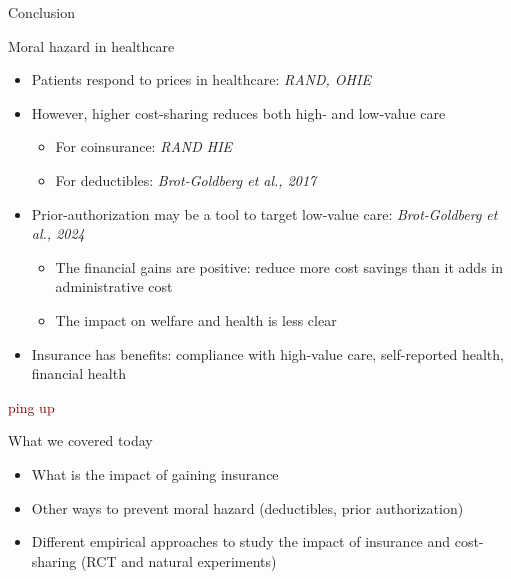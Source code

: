 \begin{frame}{Conclusion}

    Moral hazard in healthcare
    \begin{itemize}
        \item Patients respond to prices in healthcare: \textit{RAND, OHIE}
        \item However, higher cost-sharing reduces both high- and low-value care 
        \begin{itemize}
            \item For coinsurance: \textit{RAND HIE}
            \item For deductibles: \textit{Brot-Goldberg et al., 2017}
        \end{itemize}
        \item Prior-authorization may be a tool to target low-value care: \textit{Brot-Goldberg et al., 2024}
        \begin{itemize}
            \item The financial gains are positive: reduce more cost savings than it adds in administrative cost
            \item The impact on welfare and health is less clear
        \end{itemize}
        \item Insurance has benefits: compliance with high-value care, self-reported health, financial health
    \end{itemize}
            
\end{frame}
\begin{frame}{}
    \begin{center}
    \Large \textcolor{maroon}{ping up}
    \end{center}
\end{frame}
\begin{frame}{What we covered today}
    \begin{itemize}
    \item What is the impact of gaining insurance
    \item Other ways to prevent moral hazard (deductibles, prior authorization)
    \item Different empirical approaches to study the impact of insurance and cost-sharing (RCT and natural experiments)
\end{itemize}
\end{frame}
